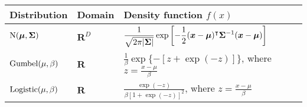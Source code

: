 \begin{tabularx}{\linewidth}{llX}
	Distribution & Domain & Density function $f(x)$ \\
	\midrule
	$\mathrm{N}( \bm{\mu}, \bm{\Sigma} )$
    & $\mathbf{R}^D$
	  & $\displaystyle \frac{1}{\sqrt{2 \pi \lvert\bm{\Sigma}\rvert}}
	      \exp \left[ -\frac{1}{2} (\bm{x} - \bm{\mu})^\intercal \bm{\Sigma}^{-1} (\bm{x} - \bm{\mu}) \right] $ \\
	\rule{0pt}{5ex}%
	$\mathrm{Gumbel}( \mu, \beta )$
	  & $\mathbf{R}$
	  & $\displaystyle \frac{1}{\beta} \exp \{ - [z + \exp(-z)]\}$, where $\displaystyle z = \frac{x - \mu}{\beta}$ \\
	\rule{0pt}{5ex}%
	$\mathrm{Logistic}( \mu, \beta )$
	  & $\mathbf{R}$
    & $\displaystyle \frac{\exp(-z)}{\beta \left[1 + \exp(-z) \right]^2}$, where $\displaystyle z = \frac{x - \mu}{\beta}$ \\
\end{tabularx}

\endgroup
